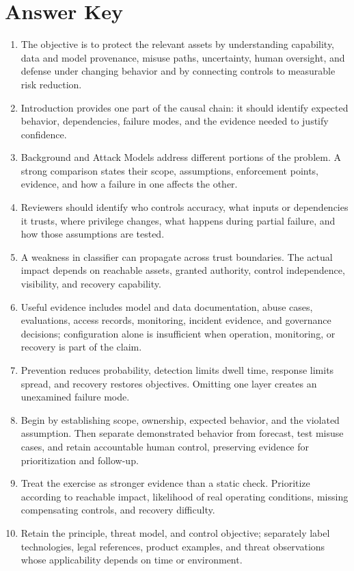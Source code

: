 \documentclass[11pt,letterpaper]{article}
\begin{document}
\section*{Answer Key}
\begin{enumerate}
\item The objective is to protect the relevant assets by understanding capability, data and model provenance, misuse paths, uncertainty, human oversight, and defense under changing behavior and by connecting controls to measurable risk reduction.
\item Introduction provides one part of the causal chain: it should identify expected behavior, dependencies, failure modes, and the evidence needed to justify confidence.
\item Background and Attack Models address different portions of the problem. A strong comparison states their scope, assumptions, enforcement points, evidence, and how a failure in one affects the other.
\item Reviewers should identify who controls accuracy, what inputs or dependencies it trusts, where privilege changes, what happens during partial failure, and how those assumptions are tested.
\item A weakness in classifier can propagate across trust boundaries. The actual impact depends on reachable assets, granted authority, control independence, visibility, and recovery capability.
\item Useful evidence includes model and data documentation, abuse cases, evaluations, access records, monitoring, incident evidence, and governance decisions; configuration alone is insufficient when operation, monitoring, or recovery is part of the claim.
\item Prevention reduces probability, detection limits dwell time, response limits spread, and recovery restores objectives. Omitting one layer creates an unexamined failure mode.
\item Begin by establishing scope, ownership, expected behavior, and the violated assumption. Then separate demonstrated behavior from forecast, test misuse cases, and retain accountable human control, preserving evidence for prioritization and follow-up.
\item Treat the exercise as stronger evidence than a static check. Prioritize according to reachable impact, likelihood of real operating conditions, missing compensating controls, and recovery difficulty.
\item Retain the principle, threat model, and control objective; separately label technologies, legal references, product examples, and threat observations whose applicability depends on time or environment.
\end{enumerate}
\end{document}
